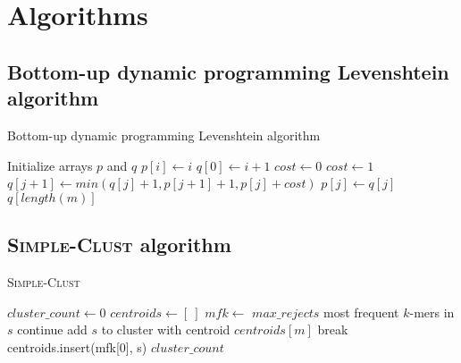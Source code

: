 \section{Algorithms}

\subsection{Bottom-up dynamic programming Levenshtein algorithm}
\label{app:levenshtein_algorithm}

\begin{algorithm}
  \caption{Bottom-up dynamic programming Levenshtein algorithm}
  \label{alg:levenshtein}
  \begin{algorithmic}[1]
    \Statex
      \State Initialize arrays $p$ and $q$
        \State $p[i] \gets i$
      \EndFor
        \State $q[0] \gets i+1$
            \State $cost \gets 0$
          \Else
            \State $cost \gets 1$
          \EndIf
          \State $q[j+1] \gets min(q[j] + 1, p[j+1] + 1, p[j] + cost)$
        \EndFor
          \State $p[j] \gets q[j]$
        \EndFor
      \EndFor
      \State \Return $q[length(m)]$
    \EndFunction
  \end{algorithmic}
\end{algorithm}

\newpage

\subsection{\textsc{Simple-Clust} algorithm}
\label{app:simple-clust}

\begin{algorithm}
  \caption{\textsc{Simple-Clust}}
  \label{alg:simple-clust}
  \begin{algorithmic}[1]
    \Statex
      \State $cluster\_count \gets 0$
      \State $centroids \gets [~]$ 
        \State $mfk \gets$ $max\_rejects$ most frequent $k$-mers in $s$
            \State continue
            \State add $s$ to cluster with centroid $centroids[m]$
            \State break
          \EndIf
        \EndFor
          \State centroids.insert(mfk[0], s)
        \EndIf
      \EndFor
      \State \Return $cluster\_count$
    \EndFunction
  \end{algorithmic}
\end{algorithm}
